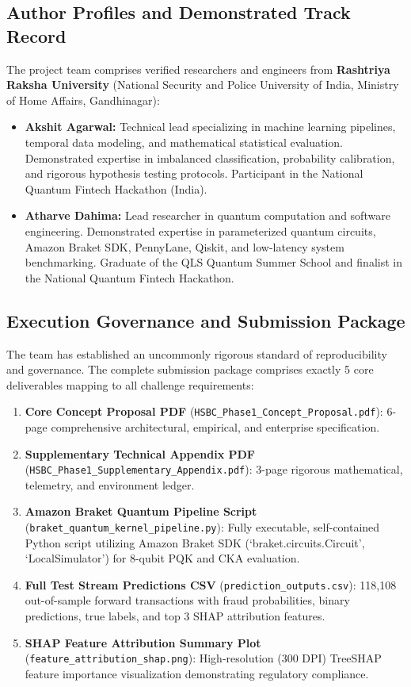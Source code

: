 \documentclass[10pt,a4paper]{article}
\begin{document}
\subsection{Author Profiles and Demonstrated Track Record}
The project team comprises verified researchers and engineers from \textbf{Rashtriya Raksha University} (National Security and Police University of India, Ministry of Home Affairs, Gandhinagar):
\begin{itemize}[leftmargin=*,itemsep=1.2pt,topsep=1pt]
\item \textbf{Akshit Agarwal:} Technical lead specializing in machine learning pipelines, temporal data modeling, and mathematical statistical evaluation. Demonstrated expertise in imbalanced classification, probability calibration, and rigorous hypothesis testing protocols. Participant in the National Quantum Fintech Hackathon (India).
\item \textbf{Atharve Dahima:} Lead researcher in quantum computation and software engineering. Demonstrated expertise in parameterized quantum circuits, Amazon Braket SDK, PennyLane, Qiskit, and low-latency system benchmarking. Graduate of the QLS Quantum Summer School and finalist in the National Quantum Fintech Hackathon.
\end{itemize}

\subsection{Execution Governance and Submission Package}
The team has established an uncommonly rigorous standard of reproducibility and governance. The complete submission package comprises exactly 5 core deliverables mapping to all challenge requirements:
\begin{enumerate}[leftmargin=*,itemsep=0.8pt,topsep=1pt]
\item \textbf{Core Concept Proposal PDF} (\texttt{HSBC\_Phase1\_Concept\_Proposal.pdf}): 6-page comprehensive architectural, empirical, and enterprise specification.
\item \textbf{Supplementary Technical Appendix PDF} (\texttt{HSBC\_Phase1\_Supplementary\_Appendix.pdf}): 3-page rigorous mathematical, telemetry, and environment ledger.
\item \textbf{Amazon Braket Quantum Pipeline Script} (\texttt{braket\_quantum\_kernel\_pipeline.py}): Fully executable, self-contained Python script utilizing Amazon Braket SDK (`braket.circuits.Circuit', `LocalSimulator') for 8-qubit PQK and CKA evaluation.
\item \textbf{Full Test Stream Predictions CSV} (\texttt{prediction\_outputs.csv}): 118,108 out-of-sample forward transactions with fraud probabilities, binary predictions, true labels, and top 3 SHAP attribution features.
\item \textbf{SHAP Feature Attribution Summary Plot} (\texttt{feature\_attribution\_shap.png}): High-resolution (300 DPI) TreeSHAP feature importance visualization demonstrating regulatory compliance.
\end{enumerate}
\end{document}
